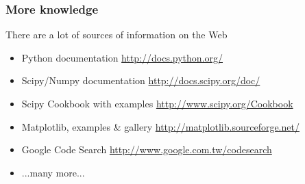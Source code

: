 \documentclass{beamer}
\begin{document}
\begin{frame}
  \frametitle{More knowledge}
  \begin{block}{There are a lot of sources of information on the Web}
   \begin{itemize}
    \item Python documentation \url{http://docs.python.org/}
   	\item Scipy/Numpy documentation \url{http://docs.scipy.org/doc/}
   	\item Scipy Cookbook with examples \url{http://www.scipy.org/Cookbook}
   	\item Matplotlib, examples \& gallery \url{http://matplotlib.sourceforge.net/}
   	\item Google Code Search \url{http://www.google.com.tw/codesearch}
   	\item ...many more...
   \end{itemize}
  \end{block}
\end{frame}
\end{document}
